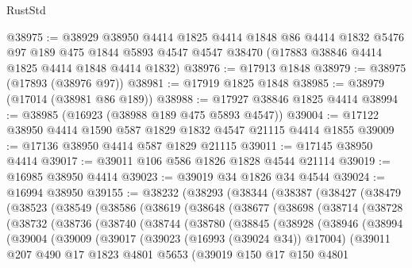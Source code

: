 \begin{lexlean}{RustStd}
\begin{coremodule}
{\begin{coremodule}
{{{{{{{{{{{{{{{{{{{{{{{{{{{{{{{{{{{{{{{{{{{{{{{{{{{{{{{@38975 := @38929
    @38950
    @4414
    @1825
    @4414
    @1848
    @86
    @4414
    @1832
    @5476
    @97
    @189
    @475
    @1844
    @5893
    @4547
    @4547
    @38470
    (@17883 @38846 @4414 @1825 @4414 @1848 @4414 @1832)
@38976 := @17913 @1848
@38979 := @38975 (@17893 (@38976 @97))
@38981 := @17919 @1825 @1848
@38985 := @38979 (@17014 (@38981 @86 @189))
@38988 := @17927 @38846 @1825 @4414
@38994 := @38985 (@16923 (@38988 @189 @475 @5893 @4547))
@39004 := @17122 @38950 @4414 @1590 @587 @1829 @1832 @4547 @21115 @4414 @1855
@39009 := @17136 @38950 @4414 @587 @1829 @21115
@39011 := @17145 @38950 @4414
@39017 := @39011 @106 @586 @1826 @1828 @4544 @21114
@39019 := @16985 @38950 @4414
@39023 := @39019 @34 @1826 @34 @4544
@39024 := @16994 @38950
@39155 := @38232
    (@38293
      (@38344
        (@38387
          (@38427
            (@38479
              (@38523
                (@38549
                  (@38586
                    (@38619
                      (@38648
                        (@38677
                          (@38698
                            (@38714
                              (@38728
                                (@38732
                                  (@38736
                                    (@38740
                                      (@38744
                                        (@38780
                                          (@38845
                                            (@38928
                                              (@38946
                                                (@38994
                                                  (@39004
                                                    (@39009
                                                      (@39017
                                                        (@39023 (@16993 (@39024 @34)) @17004)
                                                        (@39011
                                                          @207
                                                          @490
                                                          @17
                                                          @1823
                                                          @4801
                                                          @5653
                                                          (@39019
                                                            @150
                                                            @17
                                                            @150
                                                            @4801
}}}}}}}}}}}}}}}}}}}}}}}}}}}}}}}}}}}}}}}}}}}}}}}}}}}}}}}
\end{coremodule}}
\end{coremodule}
\end{lexlean}
